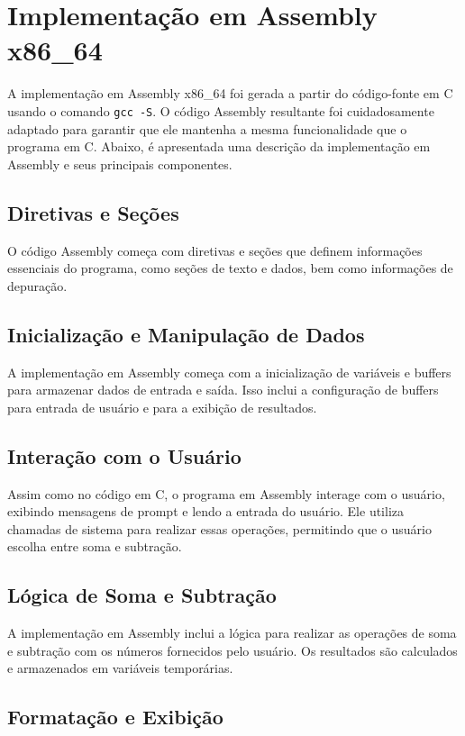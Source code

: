\documentclass[
	12pt,				%
	openright,			%
	oneside,			%
	a4paper,			%
	chapter=TITLE,		%
	english,			%
	french,				%
	spanish,			%
	brazil				%
	]{abntex2}
\theoremstyle{definition}
\begin{document}
\section{Implementação em Assembly x86\_64}

A implementação em Assembly x86\_64 foi gerada a partir do código-fonte em C usando o 
comando \texttt{gcc -S}. O código Assembly resultante foi cuidadosamente adaptado 
para garantir que ele mantenha a mesma funcionalidade que o programa em C. 
Abaixo, é apresentada uma descrição da implementação em Assembly e seus principais componentes.

\subsection{Diretivas e Seções}

O código Assembly começa com diretivas e seções que definem informações essenciais do programa, como seções de texto e dados, bem como informações de depuração.

\subsection{Inicialização e Manipulação de Dados}

A implementação em Assembly começa com a inicialização de variáveis e buffers para armazenar dados de entrada e saída. Isso inclui a configuração de buffers para entrada de usuário e para a exibição de resultados.

\subsection{Interação com o Usuário}

Assim como no código em C, o programa em Assembly interage com o usuário, exibindo mensagens de prompt e lendo a entrada do usuário. Ele utiliza chamadas de sistema para realizar essas operações, permitindo que o usuário escolha entre soma e subtração.

\subsection{Lógica de Soma e Subtração}

A implementação em Assembly inclui a lógica para realizar as operações de soma e subtração com os números fornecidos pelo usuário. Os resultados são calculados e armazenados em variáveis temporárias.

\subsection{Formatação e Exibição}
\end{document}
